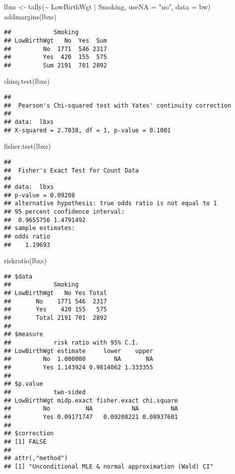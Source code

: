 \documentclass[
]{article}
\newenvironment{Shaded}{\begin{snugshade}}{\end{snugshade}}
\newcommand{\AttributeTok}[1]{\textcolor[rgb]{0.77,0.63,0.00}{#1}}
\newcommand{\FunctionTok}[1]{\textcolor[rgb]{0.00,0.00,0.00}{#1}}
\newcommand{\NormalTok}[1]{#1}
\newcommand{\OtherTok}[1]{\textcolor[rgb]{0.56,0.35,0.01}{#1}}
\newcommand{\SpecialCharTok}[1]{\textcolor[rgb]{0.00,0.00,0.00}{#1}}
\newcommand{\StringTok}[1]{\textcolor[rgb]{0.31,0.60,0.02}{#1}}
\begin{document}
\begin{Shaded}
\begin{Highlighting}[]
\NormalTok{lbxs }\OtherTok{\textless{}{-}} \FunctionTok{tally}\NormalTok{(}\SpecialCharTok{\textasciitilde{}}\NormalTok{ LowBirthWgt }\SpecialCharTok{|}\NormalTok{ Smoking, }\AttributeTok{useNA =} \StringTok{"no"}\NormalTok{, }\AttributeTok{data =}\NormalTok{ bw)}
\FunctionTok{addmargins}\NormalTok{(lbxs)}
\end{Highlighting}
\end{Shaded}

\begin{verbatim}
##            Smoking
## LowBirthWgt   No  Yes  Sum
##         No  1771  546 2317
##         Yes  420  155  575
##         Sum 2191  701 2892
\end{verbatim}

\begin{Shaded}
\begin{Highlighting}[]
\FunctionTok{chisq.test}\NormalTok{(lbxs)}
\end{Highlighting}
\end{Shaded}

\begin{verbatim}
## 
##  Pearson's Chi-squared test with Yates' continuity correction
## 
## data:  lbxs
## X-squared = 2.7038, df = 1, p-value = 0.1001
\end{verbatim}

\begin{Shaded}
\begin{Highlighting}[]
\FunctionTok{fisher.test}\NormalTok{(lbxs)}
\end{Highlighting}
\end{Shaded}

\begin{verbatim}
## 
##  Fisher's Exact Test for Count Data
## 
## data:  lbxs
## p-value = 0.09208
## alternative hypothesis: true odds ratio is not equal to 1
## 95 percent confidence interval:
##  0.9655756 1.4791492
## sample estimates:
## odds ratio 
##    1.19693
\end{verbatim}

\begin{Shaded}
\begin{Highlighting}[]
\FunctionTok{riskratio}\NormalTok{(lbxs)}
\end{Highlighting}
\end{Shaded}

\begin{verbatim}
## $data
##            Smoking
## LowBirthWgt   No Yes Total
##       No    1771 546  2317
##       Yes    420 155   575
##       Total 2191 701  2892
## 
## $measure
##            risk ratio with 95% C.I.
## LowBirthWgt estimate     lower    upper
##         No  1.000000        NA       NA
##         Yes 1.143924 0.9814062 1.333355
## 
## $p.value
##            two-sided
## LowBirthWgt midp.exact fisher.exact chi.square
##         No          NA           NA         NA
##         Yes 0.09171747   0.09208221 0.08937601
## 
## $correction
## [1] FALSE
## 
## attr(,"method")
## [1] "Unconditional MLE & normal approximation (Wald) CI"
\end{verbatim}
\end{document}

